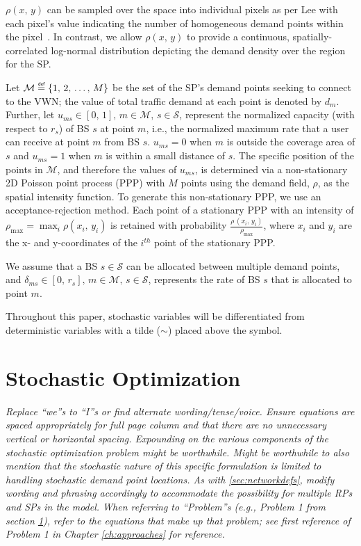 \documentclass[12pt,dvipsnames]{report}
\newcommand\defeq{\mathrel{\overset{\makebox[0pt]{\mbox{\normalfont\tiny\sffamily def}}}{=}}}
\begin{document}
$\rho\left(x,\, y\right)$ can be sampled over the space into individual pixels as per Lee with each pixel's value indicating the number of homogeneous demand points within the pixel~\cite{6554749}.  In contrast, we allow $\rho\left(x,\, y\right)$ to provide a continuous, spatially-correlated log-normal distribution depicting the demand density over the region for the SP.

Let $\mathcal{M} \defeq \{1,\, 2,\, \ldots,\, M\}$ be the set of the SP's demand points seeking to connect to the VWN; the value of total traffic demand at each point is denoted by $d_m$.  Further, let $u_{ms} \in [0,\, 1],\, m \in \mathcal{M},\, s \in \mathcal{S}$, represent the normalized capacity (with respect to $r_s$) of BS $s$ at point $m$, i.e., the normalized maximum rate that a user can receive at point $m$ from BS $s$.  $u_{ms} = 0$ when $m$ is outside the coverage area of $s$ and $u_{ms} = 1$ when $m$ is within a small distance of $s$.  The specific position of the points in $\mathcal{M}$, and therefore the values of $u_{ms}$, is determined via a non-stationary 2D Poisson point process (PPP) with $M$ points using the demand field, $\rho$, as the spatial intensity function.  To generate this non-stationary PPP, we use an acceptance-rejection method.  Each point of a stationary PPP with an intensity of $\rho_{\max} = \max_i\rho\left(x_i,\, y_i\right)$ is retained with probability $\frac{\rho\,\left(x_i,\, y_i\right)}{\rho_{\max}}$, where $x_i$ and $y_i$ are the x- and y-coordinates of the $i^{th}$ point of the stationary PPP.

We assume that a BS $s \in \mathcal{S}$ can be allocated between multiple demand points, and $\delta_{ms} \in [0,\, r_s],\, m \in \mathcal{M},\, s \in \mathcal{S}$, represents the rate of BS $s$ that is allocated to point $m$.

Throughout this paper, stochastic variables will be differentiated from deterministic variables with a tilde ($\sim$) placed above the symbol.

\section{Stochastic Optimization} \label{sec:stochopt}

\textit{Replace ``we''s to ``I''s or find alternate wording/tense/voice.  Ensure equations are spaced appropriately for full page column and that there are no unnecessary vertical or horizontal spacing.  Expounding on the various components of the stochastic optimization problem might be worthwhile.  Might be worthwhile to also mention that the stochastic nature of this specific formulation is limited to handling stochastic demand point locations.  As with \ref{sec:networkdefs}, modify wording and phrasing accordingly to accommodate the possibility for multiple RPs and SPs in the model.  When referring to ``Problem''s (e.g., Problem 1 from section \ref{sec:stochopt}), refer to the equations that make up that problem; see first reference of  Problem 1 in Chapter \ref{ch:approaches} for reference.}
\end{document}

